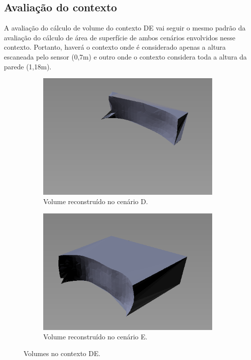 \subsection{Avaliação do contexto}
\label{sec:avaliacao_contexto_inloco}

A avaliação do cálculo de volume do contexto DE vai seguir o mesmo padrão da avaliação do cálculo de área de superfície de ambos cenários envolvidos nesse contexto.
Portanto, haverá o contexto onde é considerado apenas a altura escaneada pelo sensor (0,7m) e outro onde o contexto considera toda a altura da parede (1,18m).

\begin{figure}[H]
    \centering
    \begin{subfigure}[t]{0.48\textwidth}
        \includegraphics[width=\textwidth]{dados/figuras/volume_perto.png}
        \caption{Volume reconstruído no cenário D.}
    \end{subfigure}
    \begin{subfigure}[t]{0.48\textwidth}
        \includegraphics[width=\textwidth]{dados/figuras/volume_longe.png}
        \caption{Volume reconstruído no cenário E.}
    \end{subfigure}
    \caption{Volumes no contexto DE.}
    \label{fig:contexto_de}
\end{figure}

